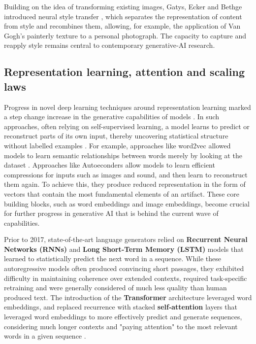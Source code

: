 Building on the idea of transforming existing images, Gatys, Ecker and Bethge introduced neural style transfer \cite{Gatys2016-qm}, which separates the representation of content from style and recombines them, allowing, for example, the application of Van Gogh’s painterly texture to a personal photograph. The capacity to capture and reapply style remains central to contemporary generative‑AI research.

\subsection{Representation learning, attention and scaling laws}

Progress in novel deep learning techniques around representation learning marked a step change increase in the generative capabilities of models \cite{Bengio2012-lt}. In such approaches, often relying on self-supervised learning, a model learns to predict or reconstruct parts of its own input, thereby uncovering statistical structure without labelled examples \cite{LeCun2015-zb}. For example, approaches like word2vec allowed models to learn semantic relationships between words merely by looking at the dataset \cite{Mikolov2013-ii}. Approaches like Autoeconders allow models to learn efficient compressions for inputs such as images and sound, and then learn to reconstruct them again. To achieve this, they produce reduced representation in the form of vectors that contain the most fundamental elements of an artifact. These core building blocks, such as word embeddings and image embeddings, become crucial for further progress in generative AI that is behind the current wave of capabilities. 

Prior to 2017, state‑of‑the‑art language generators relied on \textbf{Recurrent Neural Networks (RNNs)} and \textbf{Long Short‑Term Memory (LSTM)} models \cite{Sutskever2011-ne, Pascanu2012-tl, Graves2013-yv, Hochreiter1997-eu} that learned to statistically predict the next word in a sequence. While these autoregressive models often produced convincing short passages, they exhibited difficulty in maintaining coherence over extended contexts, required task‑specific retraining and were generally considered of much less quality than human produced text. The introduction of the \textbf{Transformer} architecture leveraged word embeddings, and replaced recurrence with stacked \textbf{self‑attention} layers that leveraged word embeddings to more effectively predict and generate sequences, considering much longer contexts and "paying attention" to the most relevant words in a given sequence \cite{Vaswani2017-pb, Devlin2019-zt}. 

